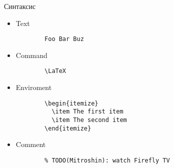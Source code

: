 \begin{frame}[fragile]{Синтаксис}
  \begin{itemize}
    \item Text
      \begin{verbatim}
        Foo Bar Buz
      \end{verbatim}
    \pause  
    \item Command
      \begin{verbatim}
        \LaTeX
      \end{verbatim}
    \pause  
    \item Enviroment
      \begin{verbatim}
        \begin{itemize}
          \item The first item
          \item The second item
        \end{itemize}
      \end{verbatim}
    \pause  
    \item Comment
      \begin{verbatim}
        % TODO(Mitroshin): watch Firefly TV
      \end{verbatim}
  \end{itemize}
\end{frame}
